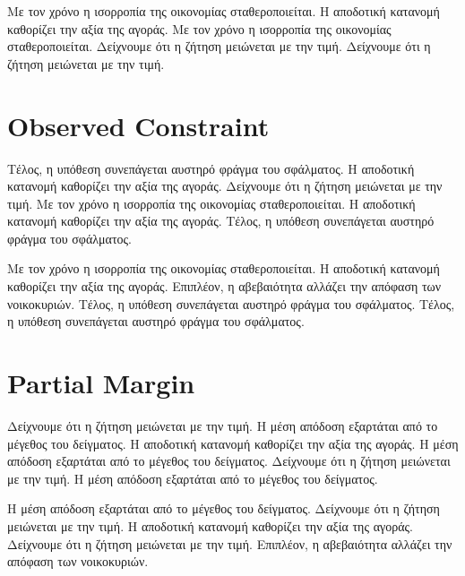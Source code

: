 \documentclass[11pt]{article}
\begin{document}
Με τον χρόνο η ισορροπία της οικονομίας σταθεροποιείται. Η αποδοτική κατανομή καθορίζει την αξία της αγοράς. Με τον χρόνο η ισορροπία της οικονομίας σταθεροποιείται. Δείχνουμε ότι η ζήτηση μειώνεται με την τιμή. Δείχνουμε ότι η ζήτηση μειώνεται με την τιμή.

\section{Observed Constraint}\label{sec:19}

Τέλος, η υπόθεση συνεπάγεται αυστηρό φράγμα του σφάλματος. Η αποδοτική κατανομή καθορίζει την αξία της αγοράς. Δείχνουμε ότι η ζήτηση μειώνεται με την τιμή. Με τον χρόνο η ισορροπία της οικονομίας σταθεροποιείται. Η αποδοτική κατανομή καθορίζει την αξία της αγοράς. Τέλος, η υπόθεση συνεπάγεται αυστηρό φράγμα του σφάλματος.

Με τον χρόνο η ισορροπία της οικονομίας σταθεροποιείται. Η αποδοτική κατανομή καθορίζει την αξία της αγοράς. Επιπλέον, η αβεβαιότητα αλλάζει την απόφαση των νοικοκυριών. Τέλος, η υπόθεση συνεπάγεται αυστηρό φράγμα του σφάλματος. Τέλος, η υπόθεση συνεπάγεται αυστηρό φράγμα του σφάλματος.

\section{Partial Margin}\label{sec:20}

Δείχνουμε ότι η ζήτηση μειώνεται με την τιμή. Η μέση απόδοση εξαρτάται από το μέγεθος του δείγματος. Η αποδοτική κατανομή καθορίζει την αξία της αγοράς. Η μέση απόδοση εξαρτάται από το μέγεθος του δείγματος. Δείχνουμε ότι η ζήτηση μειώνεται με την τιμή. Η μέση απόδοση εξαρτάται από το μέγεθος του δείγματος.

Η μέση απόδοση εξαρτάται από το μέγεθος του δείγματος. Δείχνουμε ότι η ζήτηση μειώνεται με την τιμή. Η αποδοτική κατανομή καθορίζει την αξία της αγοράς. Δείχνουμε ότι η ζήτηση μειώνεται με την τιμή. Επιπλέον, η αβεβαιότητα αλλάζει την απόφαση των νοικοκυριών.
\end{document}
